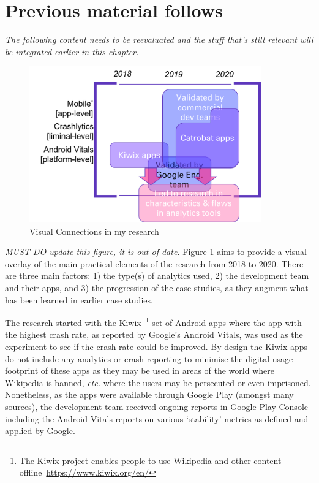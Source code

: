 \section{Previous material follows}
\textit{The following content needs to be reevaluated and the stuff that's still relevant will be integrated earlier in this chapter.}
\begin{figure}[htbp!]
    \centering
    \includegraphics[width=10cm]{images/visual-connections-in-research.png}
    \caption{Visual Connections in my research}
    \label{fig:visual-connections-in-research}
\end{figure}

\textit{MUST-DO update this figure, it is out of date.} Figure \ref{fig:visual-connections-in-research}  aims to provide a visual overlay of the main practical elements of the research from 2018 to 2020. There are three main factors: 1) the type(s) of analytics used, 2) the development team and their apps, and 3) the progression of the case studies, as they augment what has been learned in earlier case studies.

The research started with the Kiwix~\footnote{The Kiwix project enables people to use Wikipedia and other content offline~\url{https://www.kiwix.org/en/}} set of Android apps where the app with the highest crash rate, as reported by Google's Android Vitals, was used as the experiment to see if the crash rate could be improved. By design the Kiwix apps do not include any analytics or crash reporting to minimise the digital usage footprint of these apps as they may be used in areas of the world where Wikipedia is banned, \emph{etc.} where the users may be persecuted or even imprisoned. Nonetheless, as the apps were available through Google Play (amongst many sources), the development team received ongoing reports in Google Play Console including the Android Vitals reports on various `stability' metrics as defined and applied by Google.

